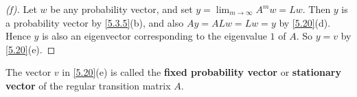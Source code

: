 \begin{proof}[(f)]
  Let \(w\) be any probability vector, and set \(y = \lim_{m \to \infty} A^m w = Lw\).
  Then \(y\) is a probability vector by \cref{5.3.5}(b), and also \(Ay = ALw = Lw = y\) by \cref{5.20}(d).
  Hence \(y\) is also an eigenvector corresponding to the eigenvalue \(1\) of \(A\).
  So \(y = v\) by \cref{5.20}(e).
\end{proof}

\begin{defn}\label{5.3.16}
  The vector \(v\) in \cref{5.20}(e) is called the \textbf{fixed probability vector} or \textbf{stationary vector} of the regular transition matrix \(A\).
\end{defn}
